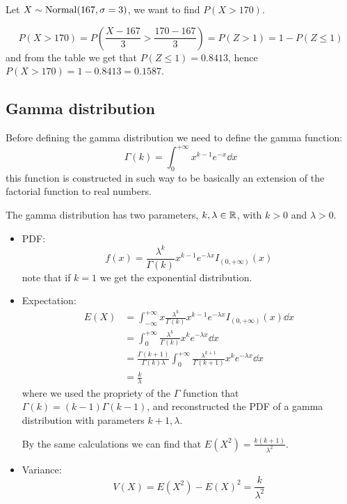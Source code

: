 \documentclass[12pt]{extarticle}
\newcommand{\Normal}{{\operatorfont Normal}}
\begin{document}
\begin{example}
    Let $X \sim \Normal(167, \sigma = 3)$, we want to find $P(X > 170)$.

    \begin{equation}
        P(X>170) = P(\frac{X - 167}{3} > \frac{170 - 167}{3}) = P(Z > 1) = 1 - P(Z \leq 1)
    \end{equation}
    and from the table we get that $P(Z \leq 1) = 0.8413$, hence $P(X > 170) = 1 - 0.8413 = 0.1587$.
\end{example}

\subsection{Gamma distribution}

Before defining the gamma distribution we need to define the gamma function:
\begin{equation}
    \Gamma(k) = \int_0^{+\infty}x^{k-1}e^{-x} \dd{x}
\end{equation}
this function is constructed in such way to be basically an extension of the factorial function to real numbers.

The gamma distribution has two parameters, $k, \lambda \in \mathbb{R}$, with $k > 0$ and $\lambda > 0$.

\begin{itemize}
    \item PDF:
          \begin{equation}
              f(x) = \frac{\lambda^k}{\Gamma(k)} x^{k-1} e^{-\lambda x} I_{(0, +\infty)}(x)
          \end{equation}
          note that if $k = 1$ we get the exponential distribution.
    \item Expectation:
          \begin{align}
              E(X) & = \int_{-\infty}^{+\infty} x \frac{\lambda^k}{\Gamma(k)} x^{k-1} e^{-\lambda x} I_{(0, +\infty)}(x) \dd{x}               \\
                   & = \int_{0}^{+\infty} \frac{\lambda^k}{\Gamma(k)} x^{k} e^{-\lambda x} \dd{x}                                             \\
                   & = \frac{\Gamma(k+1)}{\Gamma(k) \lambda} \int_{0}^{+\infty} \frac{\lambda^{k+1}}{\Gamma(k+1)} x^{k} e^{-\lambda x} \dd{x} \\
                   & = \frac{k}{\lambda}
          \end{align}
          where we used the propriety of the $\Gamma$ function that $\Gamma(k) = (k-1) \Gamma(k-1)$, and reconstructed the PDF of a gamma distribution with parameters $k+1, \lambda$.

          By the same calculations we can find that $E(X^2) = \frac{k(k+1)}{\lambda^2}$.

    \item Variance:
          \begin{equation}
              V(X) = E(X^2) - E(X)^2 = \frac{k}{\lambda^2}
          \end{equation}
\end{itemize}
\end{document}
